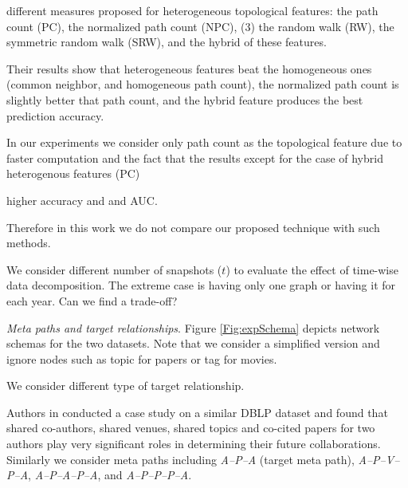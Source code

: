 different measures proposed for heterogeneous topological features: the path count (PC), the normalized path count (NPC), (3) the random walk (RW), the symmetric random walk (SRW), and the hybrid of these features.

Their results show that heterogeneous features beat the homogeneous ones (common neighbor, and homogeneous path count), the normalized path count is slightly better that path count, and the hybrid feature produces the best prediction accuracy.

In our experiments we consider only path count as the topological feature due to faster computation and the fact that the results except for the case of hybrid heterogenous features (PC) 

higher accuracy and and AUC.

\cite{liben2007link}

Therefore in this work we do not compare our proposed technique with such methods.

We consider different number of snapshots ($t$) to evaluate the effect of time-wise data decomposition. The extreme case is having only one graph or having it for each year. Can we find a trade-off?


\textit{Meta paths and target relationships}. Figure \ref{Fig:expSchema} depicts network schemas for the two datasets. Note that we consider a simplified version and ignore nodes such as topic for papers or tag for movies.

We consider different type of target relationship.


Authors in \cite{sun2011ASONAM} conducted a case study on a similar DBLP dataset and found that shared co-authors, shared venues, shared topics and co-cited papers for two authors play very significant roles in determining their future collaborations. Similarly we consider meta paths including \textit{A--P--A} (target meta path), \textit{A--P--V--P--A}, \textit{A--P--A--P--A}, and \textit{A--P--P--P--A}.


